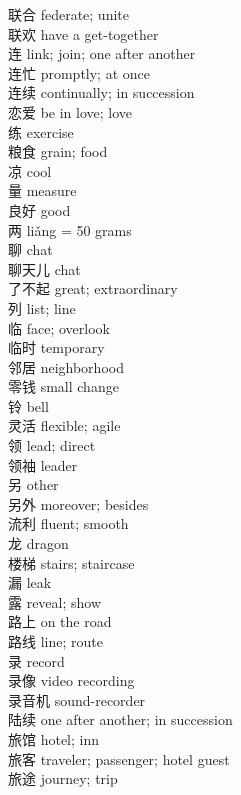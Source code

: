 联合 \quad federate; unite\\
联欢 \quad have a get-together\\
连 \quad link; join; one after another\\
连忙 \quad promptly; at once\\
连续 \quad continually; in succession\\
恋爱 \quad be in love; love\\
练 \quad exercise\\
粮食 \quad grain; food\\
凉 \quad cool\\
量 \quad measure\\
良好 \quad good\\
两  liǎng = 50 grams\\
聊 \quad chat\\
聊天儿 \quad chat\\
了不起 \quad great; extraordinary\\
列 \quad list; line\\
临 \quad face; overlook\\
临时 \quad temporary\\
邻居 \quad neighborhood\\
零钱 \quad small change\\
铃 \quad bell\\
灵活 \quad flexible; agile\\
领 \quad lead; direct\\
领袖 \quad leader\\
另 \quad other\\
另外 \quad moreover; besides\\
流利 \quad fluent; smooth\\
龙 \quad dragon\\
楼梯 \quad stairs; staircase\\
漏 \quad leak\\
露 \quad reveal; show\\
路上 \quad on the road\\
路线 \quad line; route\\
录 \quad record\\
录像 \quad video recording\\
录音机 \quad sound-recorder\\
陆续 \quad one after another; in succession\\
旅馆 \quad hotel; inn\\
旅客 \quad traveler; passenger; hotel guest\\
旅途 \quad journey; trip\\
